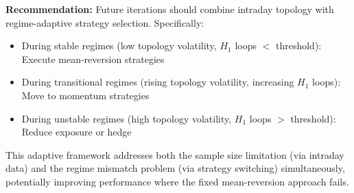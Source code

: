 \textbf{Recommendation:} Future iterations should combine intraday topology with regime-adaptive strategy selection. Specifically:
\begin{itemize}
\item During stable regimes (low topology volatility, $H_1$ loops $<$ threshold): Execute mean-reversion strategies
\item During transitional regimes (rising topology volatility, increasing $H_1$ loops): Move to momentum strategies
\item During unstable regimes (high topology volatility, $H_1$ loops $>$ threshold): Reduce exposure or hedge
\end{itemize}

This adaptive framework addresses both the sample size limitation (via intraday data) and the regime mismatch problem (via strategy switching) simultaneously, potentially improving performance where the fixed mean-reversion approach fails.
